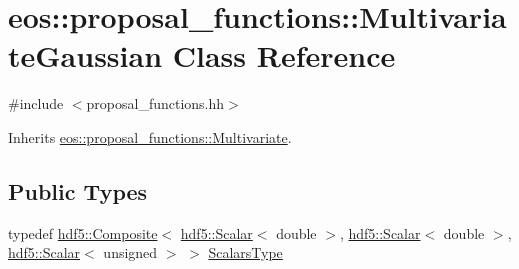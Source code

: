 \hypertarget{classeos_1_1proposal__functions_1_1MultivariateGaussian}{
\section{eos::proposal\_\-functions::MultivariateGaussian Class Reference}
\label{classeos_1_1proposal__functions_1_1MultivariateGaussian}
}


{\ttfamily \#include $<$proposal\_\-functions.hh$>$}

Inherits \hyperlink{classeos_1_1proposal__functions_1_1Multivariate}{eos::proposal\_\-functions::Multivariate}.\subsection*{Public Types}
\begin{DoxyCompactItemize}
\item 
typedef \hyperlink{classeos_1_1hdf5_1_1Composite}{hdf5::Composite}$<$ \hyperlink{classeos_1_1hdf5_1_1Scalar}{hdf5::Scalar}$<$ double $>$, \hyperlink{classeos_1_1hdf5_1_1Scalar}{hdf5::Scalar}$<$ double $>$, \hyperlink{classeos_1_1hdf5_1_1Scalar}{hdf5::Scalar}$<$ unsigned $>$ $>$ \hyperlink{classeos_1_1proposal__functions_1_1MultivariateGaussian_a434c13230be16d8d1f658f277a5b6c28}{ScalarsType}
\end{DoxyCompactItemize}
